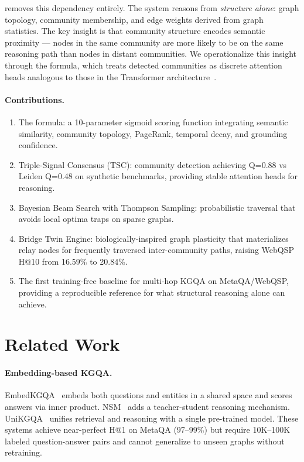 \documentclass[10pt,twocolumn]{article}
\begin{document}
\CEREBRUM{} removes this dependency entirely. The system reasons from \emph{structure
alone}: graph topology, community membership, and edge weights derived from graph
statistics. The key insight is that community structure encodes semantic proximity — nodes
in the same community are more likely to be on the same reasoning path than nodes in
distant communities. We operationalize this insight through the \CSA{} formula, which
treats detected communities as discrete attention heads analogous to those in the
Transformer architecture~\cite{vaswani2017attention}.

\paragraph{Contributions.}
\begin{enumerate}
  \item The \CSA{} formula: a 10-parameter sigmoid scoring function integrating semantic
        similarity, community topology, PageRank, temporal decay, and grounding confidence.
  \item Triple-Signal Consensus (TSC): community detection achieving Q=0.88 vs Leiden
        Q=0.48 on synthetic benchmarks, providing stable attention heads for reasoning.
  \item Bayesian Beam Search with Thompson Sampling: probabilistic traversal that
        avoids local optima traps on sparse graphs.
  \item Bridge Twin Engine: biologically-inspired graph plasticity that materializes
        relay nodes for frequently traversed inter-community paths, raising WebQSP H@10
        from 16.59\% to 20.84\%.
  \item The first training-free baseline for multi-hop KGQA on MetaQA/WebQSP, providing
        a reproducible reference for what structural reasoning alone can achieve.
\end{enumerate}

\section{Related Work}
\label{sec:related}

\paragraph{Embedding-based KGQA.}
EmbedKGQA~\cite{saxena2020improve} embeds both questions and entities in a shared space and
scores answers via inner product. NSM~\cite{he2021} adds a teacher-student reasoning
mechanism. UniKGQA~\cite{jiang2023} unifies retrieval and reasoning with a single
pre-trained model. These systems achieve near-perfect H@1 on MetaQA (97--99\%) but
require 10K--100K labeled question-answer pairs and cannot generalize to unseen graphs
without retraining.
\end{document}
